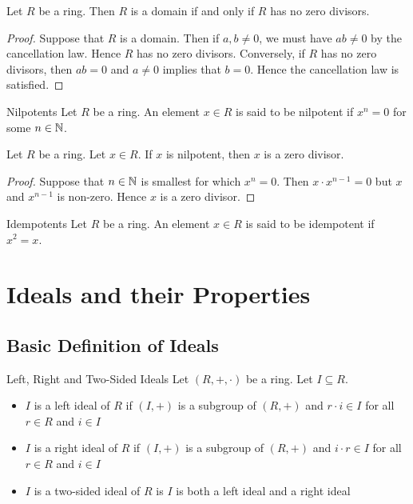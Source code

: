 \documentclass[a4paper]{article}
\begin{document}
\begin{lmm}{}{} Let $R$ be a ring. Then $R$ is a domain if and only if $R$ has no zero divisors. 
\begin{proof}
Suppose that $R$ is a domain. Then if $a,b\neq 0$, we must have $ab\neq 0$ by the cancellation law. Hence $R$ has no zero divisors. Conversely, if $R$ has no zero divisors, then $ab=0$ and $a\neq 0$ implies that $b=0$. Hence the cancellation law is satisfied. 
\end{proof}
\end{lmm}

\begin{defn}{Nilpotents}{} Let $R$ be a ring. An element $x\in R$ is said to be nilpotent if $x^n=0$ for some $n\in\mathbb{N}$. 
\end{defn}

\begin{lmm}{}{} Let $R$ be a ring. Let $x\in R$. If $x$ is nilpotent, then $x$ is a zero divisor. 
\begin{proof}
Suppose that $n\in\mathbb{N}$ is smallest for which $x^n=0$. Then $x\cdot x^{n-1}=0$ but $x$ and $x^{n-1}$ is non-zero. Hence $x$ is a zero divisor. 
\end{proof}
\end{lmm}

\begin{defn}{Idempotents}{} Let $R$ be a ring. An element $x\in R$ is said to be idempotent if $x^2=x$. 
\end{defn}


\pagebreak
\section{Ideals and their Properties}
\subsection{Basic Definition of Ideals}
\begin{defn}{Left, Right and Two-Sided Ideals}{} Let $(R,+,\cdot)$ be a ring. Let $I\subseteq R$. 
\begin{itemize}
\item $I$ is a left ideal of $R$ if $(I,+)$ is a subgroup of $(R,+)$ and $r\cdot i\in I$ for all $r\in R$ and $i\in I$
\item $I$ is a right ideal of $R$ if $(I,+)$ is a subgroup of $(R,+)$ and $i\cdot r\in I$ for all $r\in R$ and $i\in I$
\item $I$ is a two-sided ideal of $R$ is $I$ is both a left ideal and a right ideal
\end{itemize}
\end{defn}
\end{document}
